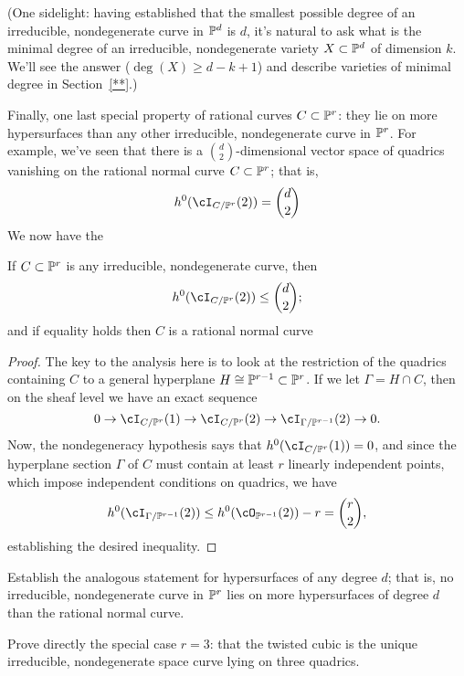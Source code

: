 (One sidelight: having established that the smallest possible degree of an irreducible, nondegenerate curve in $\PP^d$ is $d$, it's natural to ask what is the minimal degree of an irreducible, nondegenerate variety $X \subset \PP^d$ of dimension $k$. We'll see the answer ($\deg(X) \geq d-k+1$) and describe varieties of minimal degree in Section~\ref{**}.)

Finally, one last special property of rational curves $C \subset \PP^r$: they lie on more hypersurfaces than any other irreducible, nondegenerate curve in $\PP^r$. For example, we've seen that there is a  $\binom{d}{2}$-dimensional vector space of quadrics vanishing on the rational normal curve $C \subset \PP^r$; that is,
$$
h^0(\cI_{C/\PP^r}(2)) = \binom{d}{2}
$$
We now have the

\begin{proposition}
If $C \subset \PP^r$ is any irreducible, nondegenerate curve, then
$$
h^0(\cI_{C/\PP^r}(2)) \leq \binom{d}{2};
$$
and if equality holds then $C$ is a rational normal curve
\end{proposition}

\begin{proof}
The key to the analysis here is to look at the restriction of the quadrics containing $C$ to a general hyperplane $H \cong \PP^{r-1} \subset \PP^r$. If we let $\Gamma = H \cap C$, then on the sheaf level we have an exact sequence
$$
0 \to \cI_{C/\PP^r}(1) \to \cI_{C/\PP^r}(2) \to \cI_{\Gamma/\PP^{r-1}}(2) \to 0.
$$ 
Now, the nondegeneracy hypothesis says that $h^0(\cI_{C/\PP^r}(1)) = 0$, and since the hyperplane section $\Gamma$ of $C$ must contain at least $r$ linearly independent points, which impose independent conditions on quadrics, we have
$$
h^0(\cI_{\Gamma/\PP^{r-1}}(2)) \leq h^0(\cO_{\PP^{r-1}}(2)) - r = \binom{r}{2},
$$
establishing the desired inequality.
\end{proof}

\begin{exercise}
Establish the analogous statement for hypersurfaces of any degree $d$; that is, no irreducible, nondegenerate curve in $\PP^r$ lies on more hypersurfaces of degree $d$ than the rational normal curve.
\end{exercise}

\begin{exercise}
Prove directly the special case $r=3$: that the twisted cubic is the unique irreducible, nondegenerate space curve lying on three quadrics.
\end{exercise}


